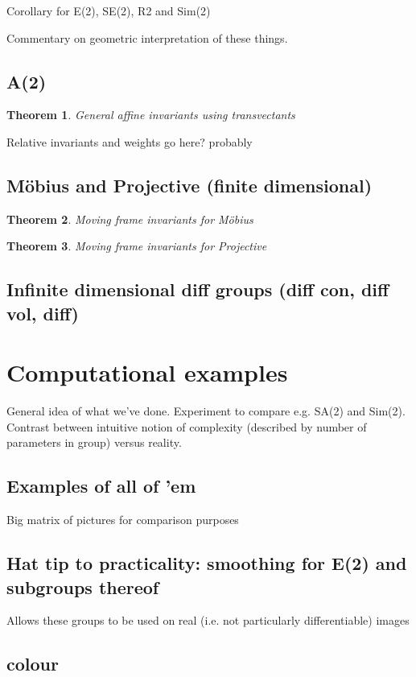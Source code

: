 \documentclass{article}
\newtheorem{theorem}{Theorem}
\begin{document}
Corollary for E(2), SE(2), R2 and Sim(2)

Commentary on geometric interpretation of these things.
\subsection{A(2)}
\begin{theorem}
  General affine invariants using transvectants
\end{theorem}
Relative invariants and weights go here? probably

\subsection{M\"obius and Projective (finite dimensional)}
\begin{theorem}
  Moving frame invariants for M\"obius
\end{theorem}
\begin{theorem}
  Moving frame invariants for Projective
\end{theorem}

\subsection{Infinite dimensional diff groups (diff con, diff vol, diff)}




\section{Computational examples}
General idea of what we've done. Experiment to compare e.g. SA(2) and
Sim(2). Contrast between intuitive notion of complexity (described by
number of parameters in group) versus reality.

\subsection{Examples of all of 'em}
Big matrix of pictures for comparison purposes

\subsection{Hat tip to practicality: smoothing for E(2) and subgroups thereof}
Allows these groups to be used on real (i.e. not particularly
differentiable) images

\subsection{colour}
\end{document}
